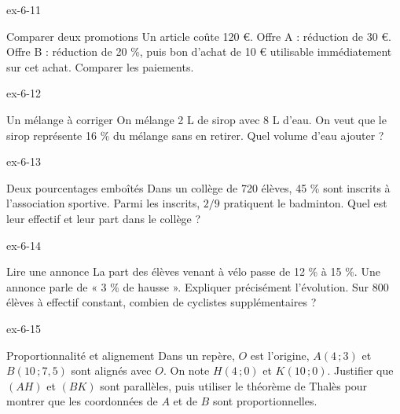 \clearpage{}
\begin{blocLivre}{ex-6-11}\begin{exercice}[3]{Comparer deux promotions}
Un article coûte 120 €. Offre A : réduction de 30 €. Offre B : réduction de 20 \%, puis bon d’achat de 10 € utilisable immédiatement sur cet achat. Comparer les paiements.
\end{exercice}\end{blocLivre}
\begin{blocLivre}{ex-6-12}\begin{exercice}[3]{Un mélange à corriger}
On mélange 2 L de sirop avec 8 L d’eau. On veut que le sirop représente 16 \% du mélange sans en retirer. Quel volume d’eau ajouter ?
\end{exercice}\end{blocLivre}
\begin{blocLivre}{ex-6-13}\begin{exercice}[3]{Deux pourcentages emboîtés}
Dans un collège de 720 élèves, 45 \% sont inscrits à l’association sportive. Parmi les inscrits, $2/9$ pratiquent le badminton. Quel est leur effectif et leur part dans le collège ?
\end{exercice}\end{blocLivre}
\begin{blocLivre}{ex-6-14}\begin{exercice}[3]{Lire une annonce}
La part des élèves venant à vélo passe de 12 \% à 15 \%. Une annonce parle de « 3 \% de hausse ». Expliquer précisément l’évolution. Sur 800 élèves à effectif constant, combien de cyclistes supplémentaires ?
\end{exercice}\end{blocLivre}
\begin{blocLivre}{ex-6-15}\begin{exercice}[3]{Proportionnalité et alignement}
Dans un repère, $O$ est l’origine, $A(4\,;3)$ et $B(10\,;7{,}5)$ sont alignés avec $O$. On note $H(4\,;0)$ et $K(10\,;0)$. Justifier que $(AH)$ et $(BK)$ sont parallèles, puis utiliser le théorème de Thalès pour montrer que les coordonnées de $A$ et de $B$ sont proportionnelles.
\label{fig-ex-6-15}
\end{exercice}\end{blocLivre}

\clearpage
